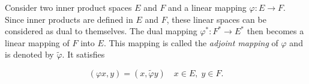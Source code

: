 Consider two inner product spaces $E$ and $F$ and a linear mapping $\varphi: E \rightarrow F$. Since inner products are defined in $E$ and $F$, these linear spaces can be considered as dual to themselves. The dual mapping $\varphi^*: F^* \rightarrow E^*$ then becomes a linear mapping of $F$ into $E$. This mapping is called the \textit{adjoint mapping} of $\varphi$ and is denoted by $\tilde{\varphi}$. It satisfies

$$(\varphi x, y) = (x, \tilde{\varphi} y) \quad x \in E,\; y \in F.$$
